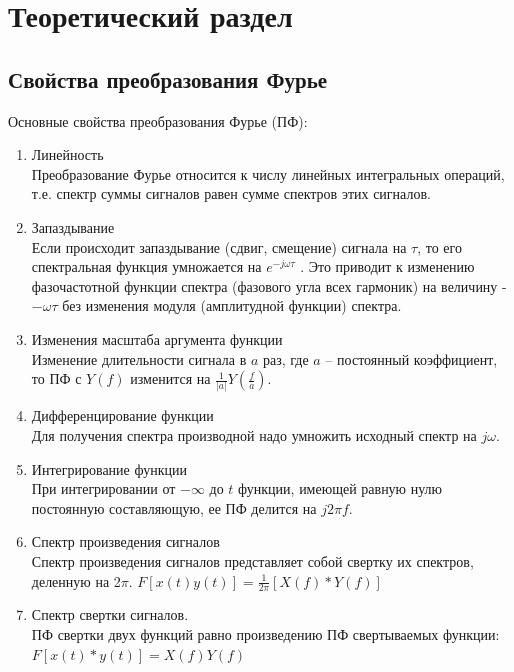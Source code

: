 \documentclass[a4paper,12pt]{article}
\begin{document}
\section{Теоретический раздел}

\subsection{Свойства преобразования Фурье}
Основные свойства преобразования Фурье (ПФ):
\begin{enumerate}
	\item Линейность\\
    Преобразование Фурье относится к числу линейных интегральных операций, т.е. спектр суммы сигналов равен сумме спектров этих сигналов.
    \item Запаздывание\\
   Если происходит запаздывание (сдвиг, смещение) сигнала на $\tau$, то его спектральная функция умножается на $e^{-j\omega \tau}$ . Это приводит к изменению фазочастотной функции спектра (фазового угла всех гармоник) на величину - $-\omega \tau$ без изменения модуля (амплитудной функции) спектра.
    \item Изменения масштаба аргумента функции\\
   Изменение длительности сигнала в $a$ раз, где $a$ -- постоянный коэффициент, то ПФ с $Y(f)$ изменится на $\frac{1}{|a|}Y(\frac{f}{a})$.
    \item Дифференцирование функции\\
    Для получения спектра производной надо умножить исходный спектр на $j \omega$.
     \item Интегрирование функции\\
    При интегрировании от $-{\infty}$ до $t$ функции, имеющей равную нулю постоянную составляющую, ее ПФ делится на $j2{\pi}f$.
    \item Спектр произведения сигналов\\
    Спектр произведения сигналов представляет собой свертку их спектров, деленную на 2$\pi$.
    $F[x(t)y(t)]={\frac{1}{2{\pi}}}[X(f)*Y(f)]$
    \item Спектр свертки сигналов.\\
    ПФ свертки двух функций равно произведению ПФ свертываемых функции: $F[x(t)*y(t)]=X(f)Y(f)$
\end{enumerate}
\end{document}
